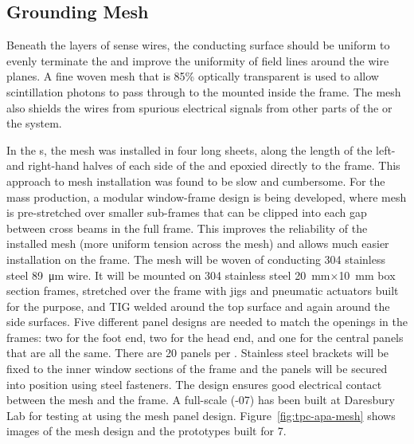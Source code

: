 \subsection{Grounding Mesh}
\label{sec:fdsp-apa-mesh}

Beneath the layers of sense wires, the conducting surface should be uniform to evenly terminate the \efield and improve the uniformity of field lines around the wire planes. A fine woven mesh that is \num{85}\% optically transparent is used to allow scintillation photons to pass through to the  mounted inside the frame.  The mesh also shields the  wires from spurious electrical signals from other parts of the  or the  system.  

In the  s, the mesh was installed in four long sheets, along the length of the left- and right-hand halves of each side of the  and epoxied directly to the frame. This approach to mesh installation was found to be slow and cumbersome.  For the  mass production, a modular window-frame design is being developed, where mesh is pre-stretched over smaller sub-frames that can be clipped into each gap between cross beams in the full  frame.   This improves the reliability of the installed mesh (more uniform tension across the mesh) and allows much easier installation on the  frame. The mesh will be woven of conducting 304 stainless steel \SI{89}{\um} wire. It will be mounted on 304 stainless steel \SI{20}{mm}$\times$\SI{10}{mm} box section frames,  stretched over the frame with jigs and pneumatic actuators built for the purpose, and TIG welded around the top surface and again around the side surfaces. Five different panel designs are needed to match the openings in the  frames: two for the foot end, two for the head end, and one for the central panels that are all the same. There are 20 panels per . Stainless steel brackets will be fixed to the inner window sections of the  frame and the panels will be secured into position using steel fasteners. The design ensures good electrical contact between the mesh and the frame. A full-scale  (-07) has been built at Daresbury Lab for  testing at  using the mesh panel design. Figure~\ref{fig:tpc-apa-mesh} shows images of the mesh design and the prototypes built for  7.

